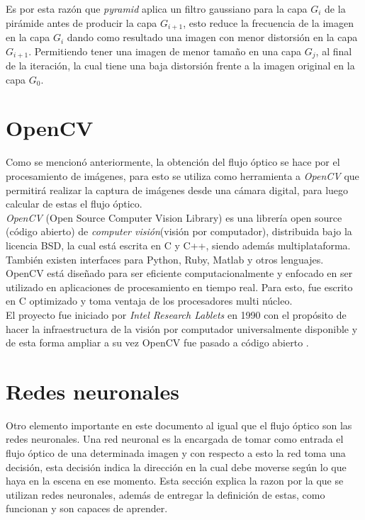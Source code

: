 \documentclass{iccmemoria}
\begin{document}
Es por esta razón que \emph{pyramid} aplica un filtro gaussiano para la capa $G_i$ de la pirámide antes de producir la capa $G_{i+1}$, esto reduce la frecuencia de la imagen en la capa $G_i$ dando como resultado una imagen con menor distorsión en la capa $G_{i+1}$. Permitiendo tener una imagen de menor tamaño en una capa $G_j$, al final de la iteración, la cual tiene una baja distorsión frente a la imagen original en la capa $G_0$.\\

\section{OpenCV}

Como se mencionó anteriormente, la obtención del flujo óptico se hace por el procesamiento de imágenes, para esto se utiliza como herramienta a \emph{OpenCV} que permitirá realizar la captura de imágenes desde una cámara digital, para luego calcular de estas el flujo óptico.\\

\emph{OpenCV} (Open Source Computer Vision Library) es una librería open source (código abierto) de \emph{computer visión}(visión por computador), distribuida bajo la licencia BSD, la cual está escrita en C y C++, siendo además multiplataforma. También existen interfaces para Python, Ruby, Matlab y otros lenguajes.\\

OpenCV está diseñado para ser eficiente computacionalmente y enfocado en ser utilizado en aplicaciones de procesamiento en tiempo real. Para esto, fue escrito en C optimizado y toma ventaja de los procesadores multi núcleo.\\

El proyecto fue iniciado por \emph{Intel Research Lablets} en 1990 con el propósito de hacer la infraestructura de la visión por computador universalmente disponible y de esta forma ampliar a su vez OpenCV fue pasado a código abierto \cite{bradski2008learning}.\\

\section{Redes neuronales}\label{redes_neuronales}

Otro elemento importante en este documento al igual que el flujo óptico son las redes neuronales. Una red neuronal es la encargada de tomar como entrada el flujo óptico de una determinada imagen y con respecto a esto la red toma una decisión, esta decisión indica la dirección en la cual debe moverse según lo que haya en la escena en ese momento. Esta sección explica la razon por la que se utilizan redes neuronales, además de entregar la definición de estas, como funcionan y son capaces de aprender.\\
\end{document}
